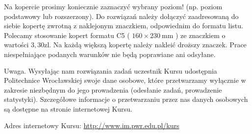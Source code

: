 \documentclass[10pt]{article}
\begin{document}
Na kopercie prosimy koniecznie zaznaczyć wybrany poziom! (np. poziom podstawowy lub rozszerzony). Do rozwiązań należy dołączyć zaadresowaną do siebie kopertę zwrotną z naklejonym znaczkiem, odpowiednim do formatu listu. Polecamy stosowanie kopert formatu C5 ( $160 \times 230 \mathrm{~mm}$ ) ze znaczkiem o wartości $3,30 \mathrm{zl}$. Na każdą większą kopertę należy nakleić droższy znaczek. Prace niespełniające podanych warunków nie będą poprawiane ani odsyłane.

Uwaga. Wysyłając nam rozwiązania zadań uczestnik Kursu udostępnia Politechnice Wrocławskiej swoje dane osobowe, które przetwarzamy wyłącznie w zakresie niezbędnym do jego prowadzenia (odesłanie zadań, prowadzenie statystyki). Szczegółowe informacje o przetwarzaniu przez nas danych osobowych są dostępne na stronie internetowej Kursu.

Adres internetowy Kursu: \href{http://www.im.pwr.edu.pl/kurs}{http://www.im.pwr.edu.pl/kurs}
\end{document}

